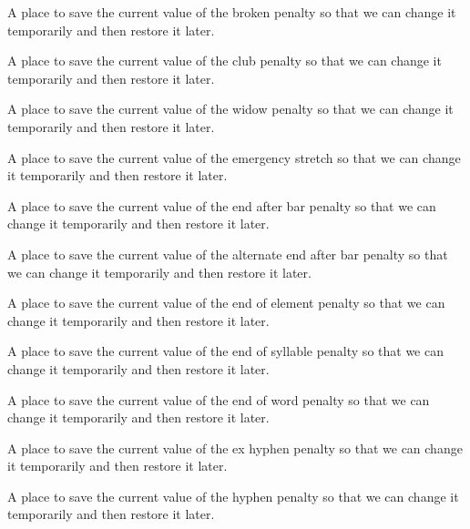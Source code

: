 A place to save the current value of the broken penalty so that we can change it temporarily and then restore it later.

A place to save the current value of the club penalty so that we can change it temporarily and then restore it later.

A place to save the current value of the widow penalty so that we can change it temporarily and then restore it later.

A place to save the current value of the emergency stretch so that we can change it temporarily and then restore it later.

A place to save the current value of the end after bar penalty so that we can change it temporarily and then restore it later.

A place to save the current value of the alternate end after bar penalty so that we can change it temporarily and then restore it later.

A place to save the current value of the end of element penalty so that we can change it temporarily and then restore it later.

A place to save the current value of the end of syllable penalty so that we can change it temporarily and then restore it later.

A place to save the current value of the end of word penalty so that we can change it temporarily and then restore it later.

A place to save the current value of the ex hyphen penalty so that we can change it temporarily and then restore it later.

A place to save the current value of the hyphen penalty so that we can change it temporarily and then restore it later.

